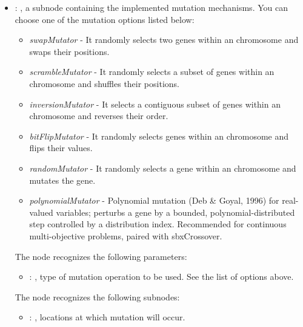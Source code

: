 \begin{itemize}
\begin{itemize}
\begin{itemize}
            \item {}: ,
              a subnode containing the implemented mutation mechanisms. You can choose one of the
              mutation options listed below:                 \begin{itemize}                   \item
              \textit{swapMutator} - It randomly selects two genes within an chromosome and swaps
              their positions.                   \item \textit{scrambleMutator} - It randomly
              selects a subset of genes within an chromosome and shuffles their positions.
              \item \textit{inversionMutator} - It selects a contiguous subset of genes within an
              chromosome and reverses their order.                   \item \textit{bitFlipMutator} -
              It randomly selects genes within an chromosome and flips their values.
              \item \textit{randomMutator} - It randomly selects a gene within an chromosome and
              mutates the gene.                   \item \textit{polynomialMutator} - Polynomial
              mutation (Deb \& Goyal, 1996) for real-valued variables; perturbs a gene by a bounded,
              polynomial-distributed step controlled by a distribution index. Recommended for
              continuous multi-objective problems, paired with sbxCrossover.
              \end{itemize}
              The  node recognizes the following parameters:
                \begin{itemize}
                  \item {}: ,
                    type of mutation operation to be used. See the list of options above.
              \end{itemize}

              The  node recognizes the following subnodes:
              \begin{itemize}
                \item {}: ,
                  locations at which mutation will occur.


\end{itemize}
\end{itemize}
\end{itemize}
\end{itemize}
